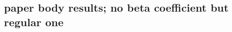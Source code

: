 \documentclass[10pt, letterpaper]{article}
\begin{document}
\begin{spacing}{1.8}
\section{paper body results; no beta coefficient but regular one}







\end{spacing}
\end{document}
